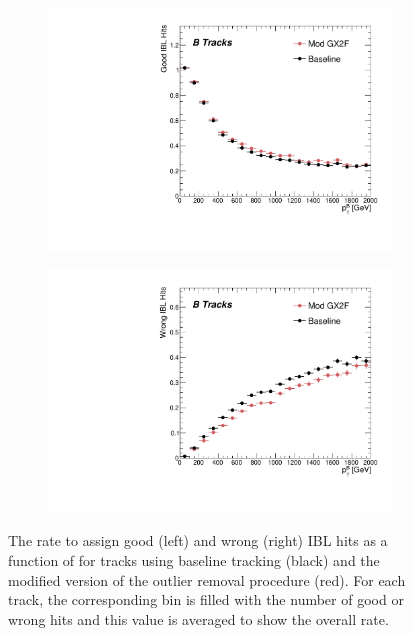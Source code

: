 \begin{figure}[!htbp]
    \centering
    \begin{subfigure}{.48\textwidth}
      \centering
      \includegraphics[width=\textwidth]{chapters/3.tracking/figs/p_nGoodHitsIBL_pTB_From_B.pdf}
    \end{subfigure}%
    \begin{subfigure}{.48\textwidth}
      \centering
      \includegraphics[width=\textwidth]{chapters/3.tracking/figs/p_nWrongHitsIBL_pTB_From_B.pdf}
    \end{subfigure}
    \caption{
      The rate to assign good (left) and wrong (right) IBL hits as a function of \bhadron \pt for tracks using baseline tracking (black) and the modified version of the outlier removal procedure (red).
      For each track, the corresponding \pt bin is filled with the number of good or wrong hits and this value is averaged to show the overall rate.
    }
    \label{fig:gx2f_opt_hits}
\end{figure}

